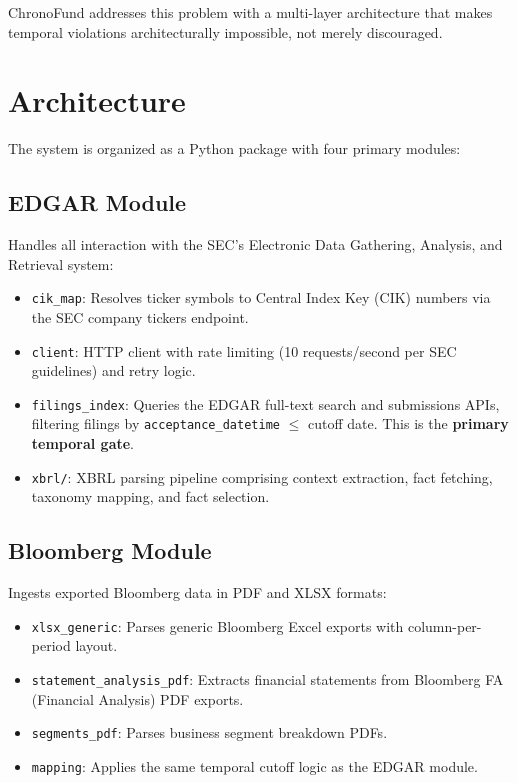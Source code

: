 \documentclass[11pt]{article}
\begin{document}
ChronoFund addresses this problem with a multi-layer architecture that makes temporal violations architecturally impossible, not merely discouraged.

\section{Architecture}

The system is organized as a Python package with four primary modules:

\subsection{EDGAR Module}
Handles all interaction with the SEC's Electronic Data Gathering, Analysis, and Retrieval system:
\begin{itemize}[nosep]
    \item \texttt{cik\_map}: Resolves ticker symbols to Central Index Key (CIK) numbers via the SEC company tickers endpoint.
    \item \texttt{client}: HTTP client with rate limiting (10 requests/second per SEC guidelines) and retry logic.
    \item \texttt{filings\_index}: Queries the EDGAR full-text search and submissions APIs, filtering filings by \texttt{acceptance\_datetime} $\leq$ cutoff date. This is the \textbf{primary temporal gate}.
    \item \texttt{xbrl/}: XBRL parsing pipeline comprising context extraction, fact fetching, taxonomy mapping, and fact selection.
\end{itemize}

\subsection{Bloomberg Module}
Ingests exported Bloomberg data in PDF and XLSX formats:
\begin{itemize}[nosep]
    \item \texttt{xlsx\_generic}: Parses generic Bloomberg Excel exports with column-per-period layout.
    \item \texttt{statement\_analysis\_pdf}: Extracts financial statements from Bloomberg FA (Financial Analysis) PDF exports.
    \item \texttt{segments\_pdf}: Parses business segment breakdown PDFs.
    \item \texttt{mapping}: Applies the same temporal cutoff logic as the EDGAR module.
\end{itemize}
\end{document}
